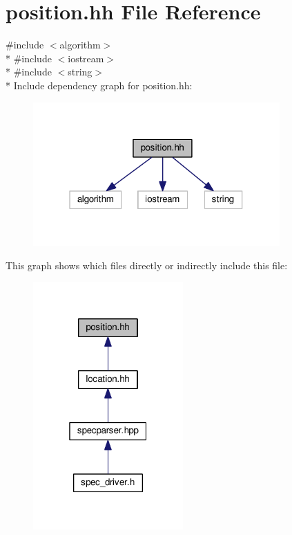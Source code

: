 \hypertarget{position_8hh}{}\section{position.\+hh File Reference}
\label{position_8hh}
{\ttfamily \#include $<$algorithm$>$}\\*
{\ttfamily \#include $<$iostream$>$}\\*
{\ttfamily \#include $<$string$>$}\\*
Include dependency graph for position.\+hh\+:\nopagebreak
\begin{figure}[H]
\begin{center}
\leavevmode
\includegraphics[width=268pt]{position_8hh__incl}
\end{center}
\end{figure}
This graph shows which files directly or indirectly include this file\+:\nopagebreak
\begin{figure}[H]
\begin{center}
\leavevmode
\includegraphics[width=163pt]{position_8hh__dep__incl}
\end{center}
\end{figure}

